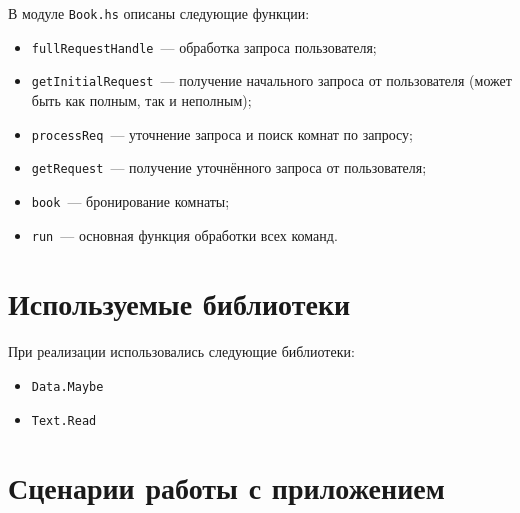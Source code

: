 \documentclass[oneside,final,14pt]{extarticle}
\begin{document}
В модуле \texttt{Book.hs} описаны следующие функции:
\begin{itemize}
    \item \texttt{fullRequestHandle}~--- обработка запроса пользователя;
    \item \texttt{getInitialRequest}~--- получение начального запроса от пользователя
    (может быть как полным, так и неполным);
    \item \texttt{processReq}~--- уточнение запроса и поиск комнат по запросу;
    \item \texttt{getRequest}~--- получение уточнённого запроса от 
    пользователя;
    \item \texttt{book}~--- бронирование комнаты;
    \item \texttt{run}~--- основная функция обработки всех команд.
\end{itemize}

\section{Используемые библиотеки}

При реализации использовались следующие библиотеки:
\begin{itemize}
    \item \texttt{Data.Maybe}
    \item \texttt{Text.Read} 
\end{itemize}

\section{Сценарии работы с приложением}
\end{document}
